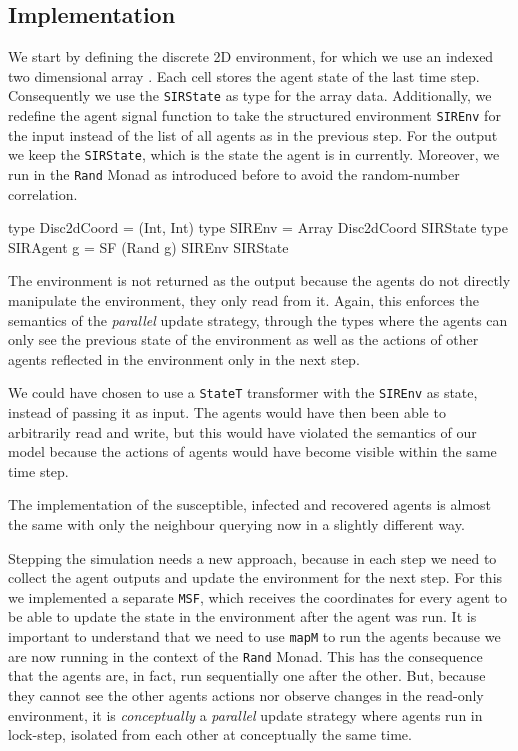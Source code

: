 \subsection{Implementation}
\label{sub:timedriven_thirdstep_impl}
We start by defining the discrete 2D environment, for which we use an indexed two dimensional array \cite{array_hackage}. Each cell stores the agent state of the last time step. Consequently we use the \texttt{SIRState} as type for the array data. Additionally, we redefine the agent signal function to take the structured environment \texttt{SIREnv} for the input instead of the list of all agents as in the previous step. For the output we keep the \texttt{SIRState}, which is the state the agent is in currently. Moreover, we run in the \texttt{Rand} Monad as introduced before to avoid the random-number correlation. 

\begin{HaskellCode}
type Disc2dCoord = (Int, Int)
type SIREnv      = Array Disc2dCoord SIRState
type SIRAgent g  = SF (Rand g) SIREnv SIRState
\end{HaskellCode}

The environment is not returned as the output because the agents do not directly manipulate the environment, they only read from it. Again, this enforces the semantics of the \textit{parallel} update strategy, through the types where the agents can only see the previous state of the environment as well as the actions of other agents reflected in the environment only in the next step.

We could have chosen to use a \texttt{StateT} transformer with the \texttt{SIREnv} as state, instead of passing it as input. The agents would have then been able to arbitrarily read and write, but this would have violated the semantics of our model because the actions of agents would have become visible within the same time step.

The implementation of the susceptible, infected and recovered agents is almost the same with only the neighbour querying now in a slightly different way. 

Stepping the simulation needs a new approach, because in each step we need to collect the agent outputs and update the environment for the next step. For this we implemented a separate \texttt{MSF}, which receives the coordinates for every agent to be able to update the state in the environment after the agent was run. It is important to understand that we need to use \texttt{mapM} to run the agents because we are now running in the context of the \texttt{Rand} Monad. This has the consequence that the agents are, in fact, run sequentially one after the other. But, because they cannot see the other agents actions nor observe changes in the read-only environment, it is \textit{conceptually} a \textit{parallel} update strategy where agents run in lock-step, isolated from each other at conceptually the same time.
  
